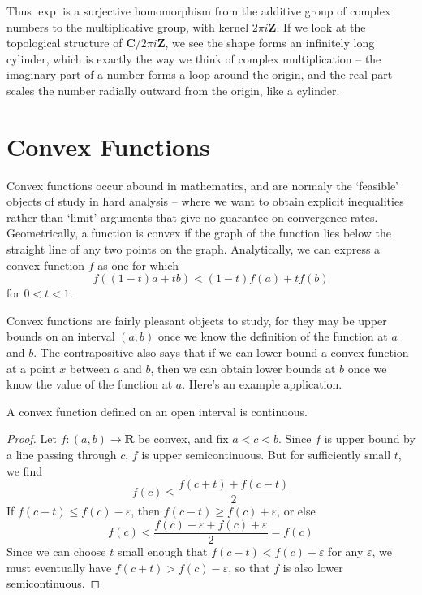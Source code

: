 Thus $\exp$ is a surjective homomorphism from the additive group of complex numbers to the multiplicative group, with kernel $2\pi i \mathbf{Z}$. If we look at the topological structure of $\mathbf{C}/2 \pi i \mathbf{Z}$, we see the shape forms an infinitely long cylinder, which is exactly the way we think of complex multiplication -- the imaginary part of a number forms a loop around the origin, and the real part scales the number radially outward from the origin, like a cylinder.

\chapter{Convex Functions}

Convex functions occur abound in mathematics, and are normaly the `feasible' objects of study in hard analysis -- where we want to obtain explicit inequalities rather than `limit' arguments that give no guarantee on convergence rates. Geometrically, a function is convex if the graph of the function lies below the straight line of any two points on the graph. Analytically, we can express a convex function $f$ as one for which
%
\[ f((1-t)a + tb) < (1-t)f(a) + tf(b) \]
%
for $0 < t < 1$.

Convex functions are fairly pleasant objects to study, for they may be upper bounds on an interval $(a,b)$ once we know the definition of the function at $a$ and $b$. The contrapositive also says that if we can lower bound a convex function at a point $x$ between $a$ and $b$, then we can obtain lower bounds at $b$ once we know the value of the function at $a$. Here's an example application.

\begin{theorem}
    A convex function defined on an open interval is continuous.
\end{theorem}
\begin{proof}
    Let $f:(a,b) \to \mathbf{R}$ be convex, and fix $a < c < b$. Since $f$ is upper bound by a line passing through $c$, $f$ is upper semicontinuous. But for sufficiently small $t$, we find
    \[ f(c) \leq \frac{f(c + t) + f(c-t)}{2} \]
    If $f(c+t) \leq f(c) - \varepsilon$, then $f(c-t) \geq f(c) + \varepsilon$, or else
    \[ f(c) < \frac{f(c) - \varepsilon + f(c) + \varepsilon}{2} = f(c) \]
    Since we can choose $t$ small enough that $f(c-t) < f(c) + \varepsilon$ for any $\varepsilon$, we must eventually have $f(c+t) > f(c) - \varepsilon$, so that $f$ is also lower semicontinuous.
\end{proof}

